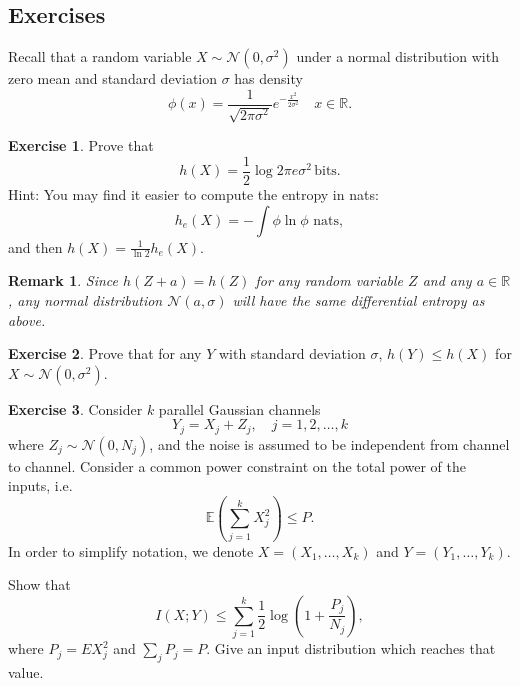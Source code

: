 \documentclass[a4paper, 11pt, openany]{book}
\numberwithin{equation}{section}
\theoremstyle{plain}
\newtheorem{remark}		[equation]	{Remark}
\theoremstyle{definition}
\newtheorem{exercise}   {Exercise}  [section]
\newcommand{\expectation}{\mathbb{E}}
\newcommand{\alphabet}[1]{\mathcal{#1}}
\begin{document}
\subsection{Exercises}


Recall that a random variable $X \sim \alphabet{N}(0, \sigma^2)$ under a normal distribution with zero mean and standard deviation $\sigma$ has density
$$
	\phi(x) = \frac{1}{\sqrt{2\pi \sigma^2}} e^{-\frac{x^2}{2 \sigma^2}} \quad x \in \mathbb{R}.
$$

\begin{exercise}
Prove that 
$$
	h(X)  = \frac{1}{2} \log 2 \pi e \sigma^2 \, \text{bits}.
$$
Hint: You may find it easier to compute the entropy in nats:
$$
	h_e(X) = - \int \phi \ln \phi \,\,\text{nats},
$$
and then $h(X) = \frac{1}{\ln 2} h_e(X)$.
\end{exercise}


\begin{remark}
Since $h(Z + a) = h(Z)$ for any random variable $Z$ and any $a \in \mathbb{R}$, any normal distribution $\alphabet{N}(a,\sigma)$ will have the same differential entropy as above.
\end{remark}



\begin{exercise}
Prove that for any $Y$ with standard deviation $\sigma$, $h(Y) \le h(X)$ for $X \sim \alphabet{N}(0,\sigma^2)$. 
\end{exercise}


\begin{exercise}
Consider $k$ parallel Gaussian channels 
\[
	Y_j = X_j + Z_j, \quad j=1, 2, \dots, k
\]
where $Z_j \sim \alphabet{N}(0, N_j)$, and the noise is assumed to be independent from channel to channel. Consider a common power constraint on the total power of the inputs, i.e.
\[
	\expectation \left( \sum_{j=1}^k X_j^2 \right) \le P.
\]
In order to simplify notation, we denote $X = (X_1, \dots, X_k)$ and $Y = (Y_1, \dots, Y_k)$.

Show that 
\[
	I(X; Y) \le \sum_{j=1}^k \frac{1}{2} \log \left( 1 + \frac{ P_j }{ N_j } \right),
\]
where $P_j = E X_j^2$ and $\sum_j P_j = P$. Give an input distribution which reaches that value.
\end{exercise}
\end{document}
